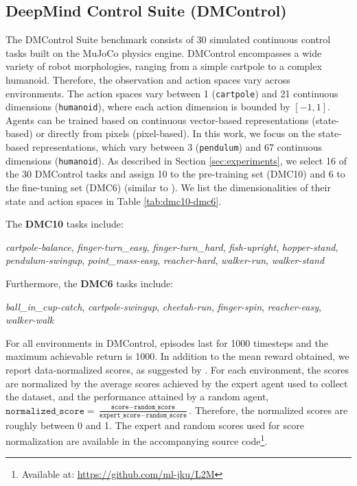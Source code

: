 \subsection{DeepMind Control Suite (DMControl)}
The DMControl Suite benchmark \citep{Tassa:18} consists of 30 simulated continuous control tasks built on the MuJoCo physics engine. DMControl encompasses a wide variety of robot morphologies, ranging from a simple cartpole to a complex humanoid. Therefore, the observation and action spaces vary across environments. The action spaces vary between 1 (\texttt{cartpole}) and 21 continuous dimensions (\texttt{humanoid}), where each action dimension is bounded by $[-1, 1]$. Agents can be trained based on continuous vector-based representations (state-based) or directly from pixels (pixel-based). In this work, we focus on the state-based representations, which vary between 3 (\texttt{pendulum}) and 67 continuous dimensions (\texttt{humanoid}). As described in Section \ref{sec:experiments}, we select 16 of the 30 DMControl tasks and assign 10 to the pre-training set (DMC10) and 6 to the fine-tuning set (DMC6) (similar to \citet{Hafner:19}). We list the dimensionalities of their state and action spaces in Table \ref{tab:dmc10-dmc6}.

The \textbf{DMC10} tasks include: 

\textit{cartpole-balance}, \textit{finger-turn\_easy}, \textit{finger-turn\_hard}, \textit{fish-upright}, \textit{hopper-stand}, \textit{pendulum-swingup}, \textit{point\_mass-easy}, \textit{reacher-hard}, \textit{walker-run}, \textit{walker-stand}

Furthermore, the \textbf{DMC6} tasks include: 

\textit{ball\_in\_cup-catch}, \textit{cartpole-swingup}, \textit{cheetah-run}, \textit{finger-spin}, \textit{reacher-easy}, \textit{walker-walk}

For all environments in DMControl, episodes last for 1000 timesteps and the maximum achievable return is 1000. In addition to the mean reward obtained, we report data-normalized scores, as suggested by \citet{Fu:20}. For each environment, the scores are normalized by the average scores achieved by the expert agent used to collect the dataset, and the performance attained by a random agent, $\texttt{normalized\_score} = \frac{\texttt{score} - \texttt{random\_score}}{\texttt{expert\_score} - \texttt{random\_score}}$. Therefore, the normalized scores are roughly between 0 and 1. The expert and random scores used for score normalization are available in the accompanying source code\footnote{Available at: \url{https://github.com/ml-jku/L2M}}. 


